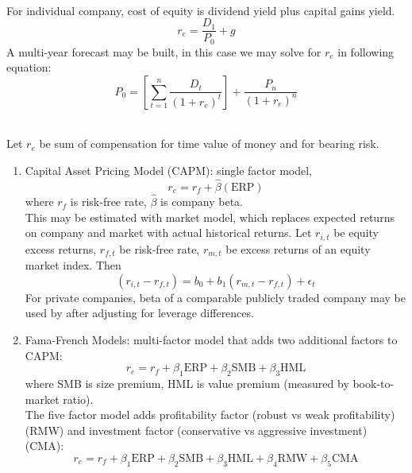 \begin{method} \\
For individual company, cost of equity is dividend yield plus capital gains yield.
\begin{equation}
r_e = \frac{D_1}{P_0} + g \nonumber
\end{equation}
A multi-year forecast may be built, in this case we may solve for $r_e$ in following equation:
\begin{equation}
P_0 = \left[ \sum\limits_{t=1}^n \frac{D_t}{(1+r_e)^t} \right] + \frac{P_n}{(1+r_e)^n} \nonumber
\end{equation}
\end{method}

\begin{method} \\
Let $r_e$ be sum of compensation for time value of money and for bearing risk.
\begin{enumerate}[label=\roman*.]
\setlength{\itemsep}{0pt}
\item Capital Asset Pricing Model (CAPM): single factor model,
\begin{equation}
r_e = r_f + \hat{\beta}(\text{ERP}) \nonumber
\end{equation}
where $r_f$ is risk-free rate, $\hat{\beta}$ is company beta.\\
This may be estimated with market model, which replaces expected returns on company and market with actual historical returns. Let $r_{i,t}$ be equity excess returns, $r_{f,t}$ be risk-free rate, $r_{m,t}$ be excess returns of an equity market index. Then
\begin{equation}
(r_{i,t} - r_{f,t}) = b_0 + b_1 (r_{m,t} - r_{f,t}) + \epsilon_t \nonumber
\end{equation}
For private companies, beta of a comparable publicly traded company may be used by after adjusting for leverage differences.
\item Fama-French Models: multi-factor model that adds two additional factors to CAPM:
\begin{equation}
r_e = r_f + \beta_1 \text{ERP} + \beta_2 \text{SMB} + \beta_3 \text{HML} \nonumber
\end{equation}
where SMB is size premium, HML is value premium (measured by book-to-market ratio).\\
The five factor model adds profitability factor (robust vs weak profitability) (RMW) and investment factor (conservative vs aggressive investment) (CMA):
\begin{equation}
r_e = r_f + \beta_1 \text{ERP} + \beta_2 \text{SMB} + \beta_3 \text{HML} + \beta_4 \text{RMW} + \beta_5 \text{CMA} \nonumber
\end{equation}
\end{enumerate}
\end{method}

